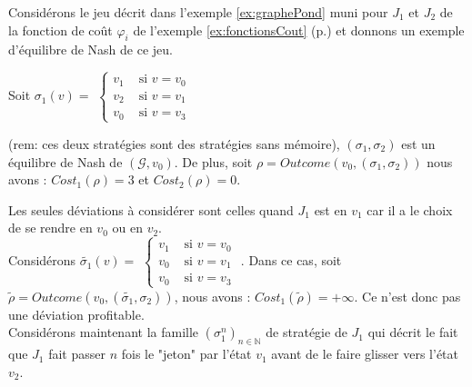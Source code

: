 
\begin{exemple}
	Considérons le jeu décrit dans l'exemple \ref{ex:graphePond} muni pour $J_{1}$ et $J_{2}$ de la fonction de coût $\varphi _{i}$ de l'exemple \ref{ex:fonctionsCout} (p.\pageref{ex:fonctionsCout}) et donnons un exemple d'équilibre de Nash de ce jeu.\\
	
	 \begin{minipage}[c]{0.30\linewidth}Soit $\sigma _{1}(v) =$ $\begin{cases}
						 v_{1} & \text{ si } v = v_{0}\\
						 v_{2} & \text{ si } v = v_{1}\\
						 v_{0} & \text{ si } v = v_{3}
						\end{cases}$ \end{minipage} \hfill
	\begin{minipage}[c]{0.30\linewidth}\end{minipage} \hfill \begin{minipage}[c]{0.30\linewidth}	 \end{minipage} \newline
		
\noindent	(rem: ces deux stratégies sont des stratégies sans mémoire), $(\sigma _{1}, \sigma _{2})$ est un équilibre de Nash de $(\mathcal{G}, v_{0})$. De plus, soit $\rho = Outcome(v_{0},(\sigma _{1},\sigma _{2}))$ nous avons : $Cost_{1}(\rho) = 3$ et $Cost_{2}(\rho) = 0$.\\
\begin{demonstration}	
	Les seules déviations à considérer sont celles quand $J_{1}$ est en $v_{1}$ car il a le choix de se rendre en $v_{0}$ ou en $v_{2}$.\\ Considérons $\tilde{\sigma _{1}}(v) = $ $\begin{cases}
						 v_{1} & \text{ si } v = v_{0}\\
						 v_{0} & \text{ si } v = v_{1}\\
						 v_{0} & \text{ si } v = v_{3}
						\end{cases}$ .
Dans ce cas, soit $\tilde{\rho} = Outcome(v_{0},(\tilde{\sigma _{1}},\sigma _{2}))$, nous avons : \mbox{$Cost_{1}(\tilde{\rho}) = + \infty$}. Ce n'est donc pas une déviation profitable.\\
Considérons maintenant la famille $(\sigma _{1}^{n})_{n \in \mathbb{N}}$ de stratégie de $J_{1}$ qui décrit le fait que $J_{1}$ fait passer $n$ fois le "jeton" par l'état $v_{1}$ avant de le faire glisser vers l'état $v_{2}$. \\


\end{demonstration}
\end{exemple}
